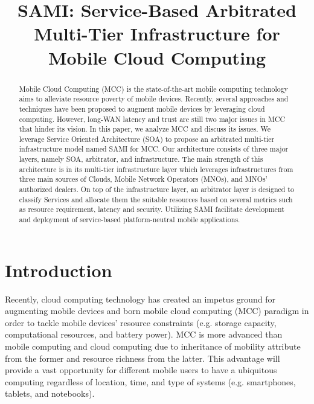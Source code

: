 \documentclass[conference]{IEEEtran}
\begin{document}
\title{SAMI: Service-Based Arbitrated Multi-Tier Infrastructure for Mobile Cloud Computing}

\author{
}
\maketitle

\begin{abstract}
Mobile Cloud Computing (MCC) is the state-of-the-art mobile computing technology aims to alleviate resource poverty of mobile devices. Recently, several approaches and techniques have been proposed to augment mobile devices by leveraging cloud computing. However, long-WAN latency and trust are still two major issues in MCC that hinder its vision. In this paper, we analyze MCC and discuss its issues. We leverage Service Oriented Architecture (SOA) to propose an arbitrated multi-tier infrastructure model named SAMI for MCC. Our architecture consists of three major layers, namely SOA, arbitrator, and infrastructure. The main strength of this architecture is in its multi-tier infrastructure layer which leverages infrastructures from three main sources of Clouds, Mobile Network Operators (MNOs), and MNOs' authorized dealers. On top of the infrastructure layer, an arbitrator layer is designed to classify Services and allocate them the suitable resources based on several metrics such as resource requirement, latency and security. Utilizing SAMI facilitate development and deployment of service-based platform-neutral mobile applications. 
\end{abstract}


\IEEEpeerreviewmaketitle

\section{Introduction}
\IEEEPARstart Recently, cloud computing technology has created an impetus ground for augmenting mobile devices and born mobile cloud computing (MCC) paradigm in order to tackle mobile devices' resource constraints (e.g. storage capacity, computational resources, and battery power). MCC is more advanced than mobile computing and cloud computing due to inheritance of mobility attribute from the former and resource richness from the latter. This advantage will provide a vast opportunity for different mobile users to have a ubiquitous computing regardless of location, time, and type of systems (e.g. smartphones, tablets, and notebooks). 
\end{document}
